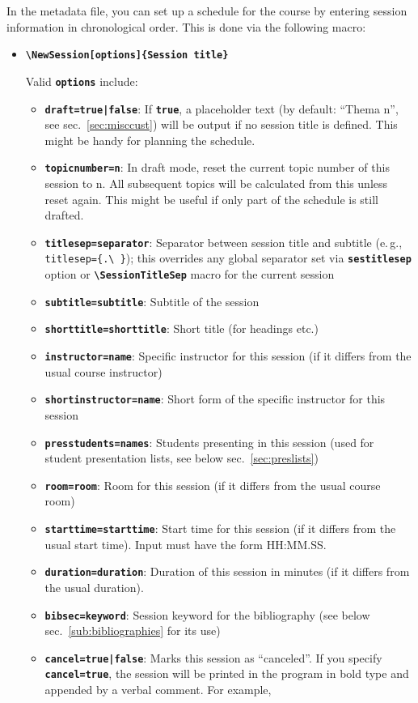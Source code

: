 \documentclass[english]{article}
\newcommand*\jmacro[1]{\textbf{\texttt{#1}}}
\newcommand*\jcsmacro[1]{\jmacro{\textbackslash{#1}}}
\newcommand*\joption[1]{\textbf{\texttt{#1}}}
\newcommand*\jparam[1]{\angus #1\angud}
\begin{document}
In the metadata file, you can set up a schedule for the course by entering
session information in chronological order. This is done via the following
macro:
\begin{itemize}
\item \jcsmacro{NewSession[\jparam{options}]\{Session title\}}


Valid \joption{\jparam{options}} include:
\begin{itemize}
\item \joption{draft=\jparam{true|false}}: If \joption{true}, a placeholder text (by default: ``Thema \jparam{n}'',
    see sec.~\ref{sec:misccust}) will be output if no session title is defined.
    This might be handy for planning the schedule.
\item \joption{topicnumber=\jparam{n}}: In draft mode, reset the current topic number of this session to \jparam{n}.
    All subsequent topics will be calculated from this unless reset again. This might be useful if only part of
    the schedule is still drafted.
\item \joption{titlesep=\jparam{separator}}: Separator between session title and
    subtitle (e.\,g., \verb|titlesep={.\ }|); this overrides any global separator set via \joption{sestitlesep} option
    or \jcsmacro{SessionTitleSep} macro for the current session
\item \joption{subtitle=\jparam{subtitle}}: Subtitle of the session
\item \joption{shorttitle=\jparam{shorttitle}}: Short title (for
    headings etc.)
\item \joption{instructor=\jparam{name}}: Specific instructor for this session
    (if it differs from the usual course instructor)
\item \joption{shortinstructor=\jparam{name}}: Short form of the specific instructor for this session
\item \joption{presstudents=\jparam{names}}: Students presenting in this session
    (used for student presentation lists, see below sec.~\ref{sec:preslists})
\item \joption{room=\jparam{room}}: Room for this session (if it differs
    from the usual course room)
\item \joption{starttime=\jparam{starttime}}: Start time for this session (if it differs
     from the usual start time). Input must have the form HH:MM.SS.
\item \joption{duration=\jparam{duration}}: Duration of this session in minutes (if it differs
     from the usual duration).
\item \joption{bibsec=\jparam{keyword}}: Session keyword for the bibliography
    (see below sec.~\ref{sub:bibliographies} for its use)
\item \joption{cancel=\jparam{true|false}}: Marks this session as ``canceled''.
    If you specify \joption{cancel=true}, the session will be printed
    in the program in bold type and appended by a verbal comment.
    For example,


\end{itemize}
\end{itemize}
\end{document}
